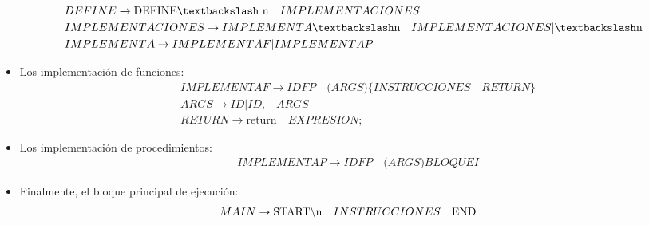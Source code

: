 \documentclass[a4paper, 12pt]{article}
\begin{document}
\begin{itemize}
\begin{align*}
&DEFINE \rightarrow \textrm{DEFINE\textbackslash \textrm{n}}\quad IMPLEMENTACIONES\\
&IMPLEMENTACIONES \rightarrow IMPLEMENTA \textbackslash \textrm{n} \quad IMPLEMENTACIONES|  \textbackslash \textrm{n}\\
&IMPLEMENTA \rightarrow IMPLEMENTAF  |IMPLEMENTAP
\end{align*}
\item Los implementación de funciones:
\begin{align*}
&IMPLEMENTAF \rightarrow  IDFP\quad  \textbf{(} ARGS \textbf{)}\textrm{\{} INSTRUCCIONES \quad RETURN \textrm{\}}\\
&ARGS \rightarrow ID|  ID \textrm{,} \quad ARGS\\
&RETURN \rightarrow  \textrm{return} \quad EXPRESION\textrm{;}
\end{align*}
\item Los implementación de procedimientos:
\begin{align*}
&IMPLEMENTAP \rightarrow  IDFP\quad  \textbf{(} ARGS \textbf{)}BLOQUEI
\end{align*}
\item Finalmente, el bloque principal de ejecución:
\begin{align*}
&MAIN \rightarrow  \textrm{START\textbackslash \textrm{n}}\quad  INSTRUCCIONES \quad \textrm{END}
\end{align*}
\end{itemize}
\end{document}

